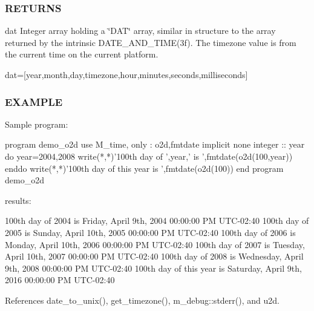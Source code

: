 \begin{DoxyVerb}
\subsubsection*{R\+E\+T\+U\+R\+NS}

dat Integer array holding a \char`\"{}\+D\+A\+T\char`\"{} array, similar in structure to the array returned by the intrinsic D\+A\+T\+E\+\_\+\+A\+N\+D\+\_\+\+T\+I\+M\+E(3f). The timezone value is from the current time on the current platform.

dat=\mbox{[}year,month,day,timezone,hour,minutes,seconds,milliseconds\mbox{]}

\subsubsection*{E\+X\+A\+M\+P\+LE}

\begin{DoxyVerb}Sample program:

 program demo_o2d
 use M_time, only : o2d,fmtdate
 implicit none
 integer :: year
    do year=2004,2008
       write(*,*)'100th day of ',year,' is ',fmtdate(o2d(100,year))
    enddo
    write(*,*)'100th day of this year is ',fmtdate(o2d(100))
 end program demo_o2d

results:

 100th day of 2004 is Friday, April 9th, 2004 00:00:00 PM UTC-02:40
 100th day of 2005 is Sunday, April 10th, 2005 00:00:00 PM UTC-02:40
 100th day of 2006 is Monday, April 10th, 2006 00:00:00 PM UTC-02:40
 100th day of 2007 is Tuesday, April 10th, 2007 00:00:00 PM UTC-02:40
 100th day of 2008 is Wednesday, April 9th, 2008 00:00:00 PM UTC-02:40
 100th day of this year is Saturday, April 9th, 2016 00:00:00 PM UTC-02:40 \end{DoxyVerb}
 

References date\+\_\+to\+\_\+unix(), get\+\_\+timezone(), m\+\_\+debug\+::stderr(), and u2d.


\end{DoxyVerb}
